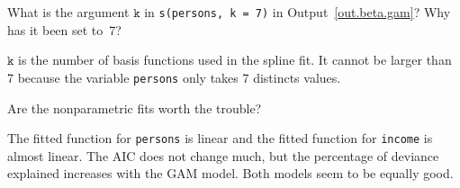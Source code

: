 \documentclass[11pt,a4paper%
addpoints, 
]{exam}
\begin{document}
\begin{questions}
\question[2]  What is the argument $\texttt{k}$ in \texttt{s(persons, k = 7)} in Output~\ref{out.beta.gam}? Why has it been set to~7?


\begin{solution}
$\texttt{k}$ is the number of basis functions used in the spline fit. It cannot be larger than 7  because the variable \texttt{persons} only takes 7 distincts values.

\end{solution}

\question[2] Are the nonparametric fits worth the trouble?

\begin{solution}
The fitted function for \texttt{persons} is linear and the fitted function for \texttt{income} is almost linear. The AIC does not change much, but the percentage of deviance explained increases with the GAM model. Both models seem to be equally good. 

\end{solution}

\end{questions}
\clearpage
\end{document}
